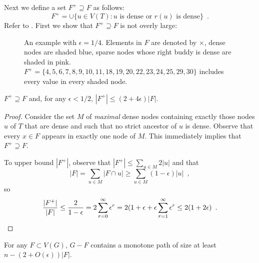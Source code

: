 \documentclass{patmorin}
\begin{document}
Next we define a set $F^+\supseteq F$ as follows: 
\[
  F^+ = \cup\{ u\in V(T): \text{$u$ is dense or $r(u)$ is dense}\} \enspace .
\]
Refer to .
First we show that $F^+\supseteq F$ is not overly large:

\begin{figure}
  \caption{An example with $\epsilon=1/4$.  Elements in $F$ are denoted by $\times$, dense nodes are shaded blue, sparse nodes whose right buddy is dense are shaded in pink. $F^+=\{4,5,6,7,8,9,10,11,18,19,20,22,23,24,25,29,30\}$ includes every value in every shaded node.}
\end{figure}

\begin{clm}
  $F^+\supseteq F$ and, for any $\epsilon < 1/2$, $|F^+|\le (2+4\epsilon)|F|$.
\end{clm}

\begin{proof}
  Consider the set $M$ of \emph{maximal} dense nodes containing exactly
  those nodes $u$ of $T$ that are dense and such that no strict ancestor
  of $u$ is dense.  Observe that every $x\in F$ appears in exactly one
  node of $M$.  This immediately implies that $F^+\supseteq F$.

  To upper bound $|F^+|$, observe that $|F^+| \le \sum_{u\in M} 2|u|$
  and that 
  \[ 
     |F| = \sum_{u\in M} |F\cap u| \ge \sum_{u\in M} (1-\epsilon)|u| \enspace , 
  \]
  so
  \[
    \frac{|F^+|}{|F|} 
      \le \frac{2}{1-\epsilon} 
  = 2\sum_{r=0}^\infty\epsilon^r 
  = 2(1+\epsilon + \epsilon\sum_{r=1}^\infty \epsilon^r 
  \le 2(1+2\epsilon) \enspace . \qedhere
  \]
\end{proof}

\begin{clm}
  For any $F\subset V(G)$, $G-F$ contains a monotone path 
  of size at least $n - (2+O(\epsilon))|F|$.
\end{clm}
\end{document}
